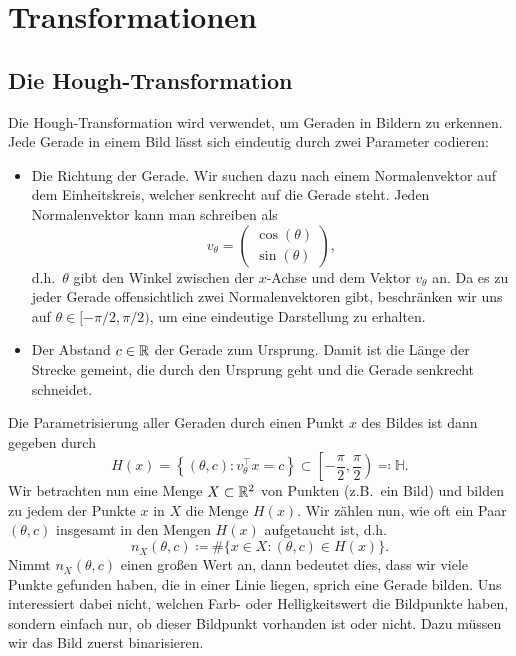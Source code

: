 \chapter{Transformationen}

\section{Die Hough-Transformation}

Die Hough-Transformation wird verwendet, um Geraden in Bildern zu erkennen. Jede Gerade in einem 
Bild lässt sich eindeutig durch zwei Parameter codieren:
\begin{itemize}
\item Die Richtung der Gerade. Wir suchen dazu nach einem Normalenvektor auf dem Einheitskreis, 
  welcher senkrecht auf die Gerade steht. Jeden Normalenvektor kann man schreiben als
  \[
    v_{\theta} = \begin{pmatrix} \cos(\theta) \\ \sin(\theta) \end{pmatrix},
  \]
  d.h.\ $ \theta $ gibt den Winkel zwischen der $ x $-Achse und dem Vektor $ v_{\theta} $ an. Da es
  zu jeder Gerade offensichtlich zwei Normalenvektoren gibt, beschränken wir uns auf
  $ \theta \in [-\pi / 2, \pi / 2) $, um eine eindeutige Darstellung zu erhalten.
\item Der Abstand $ c \in \mathbb{R} $ der Gerade zum Ursprung. Damit ist die Länge der Strecke gemeint, 
  die durch den Ursprung geht und die Gerade senkrecht schneidet.
\end{itemize}
Die Parametrisierung aller Geraden durch einen Punkt $ x $ des Bildes ist dann gegeben durch
\[
  H(x) = \left\{ 
    (\theta, c) : v_{\theta}^{\top} x = c
  \right\} \subset \left[ -\frac{\pi}{2}, \frac{\pi}{2} \right) \eqqcolon \mathbb{H}.
\]
Wir betrachten nun eine Menge $ X \subset \mathbb{R}^{2} $ von Punkten (z.B.\ ein Bild) und bilden zu jedem 
der Punkte $ x $ in $ X $ die Menge $ H(x) $. Wir zählen nun, wie oft ein Paar $ (\theta, c) $
insgesamt in den Mengen $ H(x) $ aufgetaucht ist, d.h.\
\[
  n_{X}(\theta, c) \coloneqq \#\{ x \in X : (\theta, c) \in H(x) \}.
\]
Nimmt $ n_{X}(\theta, c) $ einen großen Wert an, dann bedeutet dies, dass wir viele Punkte gefunden
haben, die in einer Linie liegen, sprich eine Gerade bilden. Uns interessiert dabei nicht, welchen
Farb- oder Helligkeitswert die Bildpunkte haben, sondern einfach nur, ob dieser Bildpunkt vorhanden
ist oder nicht. Dazu müssen wir das Bild zuerst binarisieren.

